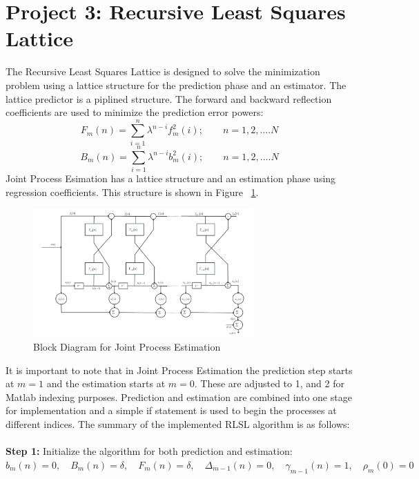 \documentclass[journal]{IEEEtran}
\begin{document}
\section{Project 3: Recursive Least Squares Lattice}
The Recursive Least Squares Lattice is designed to solve the minimization problem
using a lattice structure for the prediction phase and an estimator. The lattice predictor
is a piplined structure. The forward and backward reflection coefficients are used to minimize
the prediction error powers:
\begin{equation}
F_m(n)=\sum_{i=1}^{n}\lambda^{n-i}f^2_m(i); \qquad n = 1,2,....N
\end{equation}
\begin{equation}
B_m(n)=\sum_{i=1}^{n}\lambda^{n-i}b^2_m(i); \qquad n = 1,2,....N
\end{equation}
Joint Process Esimation has a lattice structure and an estimation phase using regression coefficients. This structure is
shown in Figure ~\ref{fig:jointprocess}.
\begin{figure}
  \centering
  \captionsetup{justification=centering,font = small}
  \includegraphics[width=0.75\textwidth] {Plots/jointprocess}
  \caption{Block Diagram for Joint Process Estimation}
    \label{fig:jointprocess}
\end{figure}
It is important to note that in Joint Process Estimation the prediction step starts at $ m = 1 $ and the estimation starts
at $m = 0$. These are adjusted to 1, and 2 for Matlab indexing purposes. Prediction and estimation are combined into one stage for implementation
and a simple if statement is used to begin the processes at different indices.
The summary of the implemented RLSL algorithm is as follows:\\
\\
\textbf{Step 1:} Initialize the algorithm for both prediction and estimation:
$b_m(n) = 0, \quad B_m(n) = \delta, \quad F_m(n) = \delta, \quad \Delta_{m-1}(n) = 0, \quad \gamma_{m-1}(n) = 1,\quad \rho_{m}(0) = 0$\\
\end{document}
